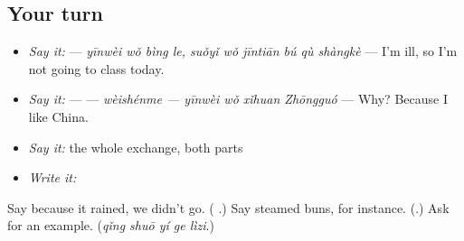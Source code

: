 \subsection*{Your turn}
\begin{itemize}
\raggedright
  \item \emph{Say it:}   — \emph{yīnwèi wǒ bìng le, suǒyǐ wǒ jīntiān bú qù shàngkè} — I'm ill, so I'm not going to class today.
  \item \emph{Say it:}  —  — \emph{wèishénme — yīnwèi wǒ xǐhuan Zhōngguó} — Why? Because I like China.
  \item \emph{Say it:} the whole exchange, both parts
  \item \emph{Write it:}  
\end{itemize}

\begin{tcolorbox}[breakable,colback=teal!4,colframe=teal!35!black,title={Before you move on}]
Say because it rained, we didn't go. (\textbf{ }.) Say steamed buns, for instance. (\textbf{}.) Ask for an example. (\emph{qǐng shuō yí ge lìzi}.)
\end{tcolorbox}
